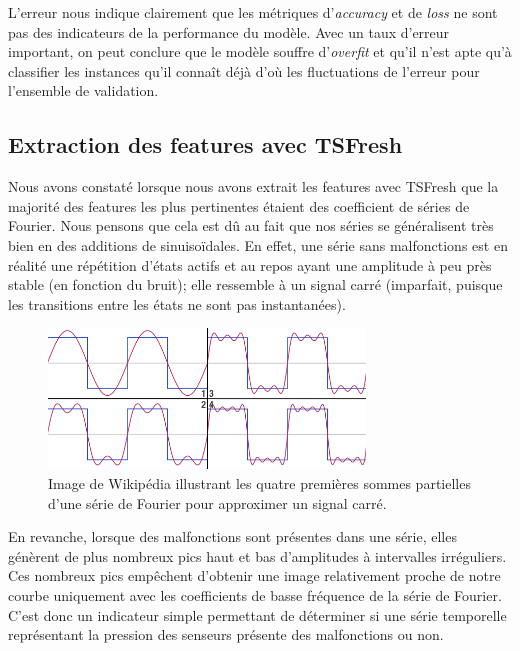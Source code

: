 \documentclass[french]{article}
\theoremstyle{mytheoremstyle}
\theoremstyle{mytheoremstyle}
\theoremstyle{myproblemstyle}
\begin{document}
    L'erreur nous indique clairement que les métriques d'\emph{accuracy} et de \emph{loss} ne sont pas des indicateurs de la performance du modèle. Avec un taux d'erreur important, on peut conclure que le modèle souffre d'\emph{overfit} et qu'il n'est apte qu'à classifier les instances qu'il connaît déjà d'où les fluctuations de l'erreur pour l'ensemble de validation.
    
    \subsection{Extraction des features avec TSFresh}

      Nous avons constaté lorsque nous avons extrait les features avec TSFresh que la majorité des features les plus pertinentes étaient des coefficient de séries de Fourier.
        Nous pensons que cela est dû au fait que nos séries se généralisent très bien en des additions de sinuisoïdales. En effet, une série sans malfonctions est en réalité une répétition d'états actifs et au repos ayant une amplitude à peu près stable (en fonction du bruit); elle ressemble à un signal carré (imparfait, puisque les transitions entre les états ne sont pas instantanées).
        
        \begin{figure}[H]
            \centering
            \includegraphics[width=0.75\textwidth]{images/signal_carre.png}
            \caption{Image de Wikipédia illustrant les quatre premières sommes partielles d'une série de Fourier pour approximer un signal carré.}
            \label{}
        \end{figure}
        
        En revanche, lorsque des malfonctions sont présentes dans une série, elles génèrent de plus nombreux pics haut et bas d'amplitudes à intervalles irréguliers. Ces nombreux pics empêchent d'obtenir une image relativement proche de notre courbe uniquement avec les coefficients de basse fréquence de la série de Fourier. C'est donc un indicateur simple permettant de déterminer si une série temporelle représentant la pression des senseurs présente des malfonctions ou non.
        
\end{document}
